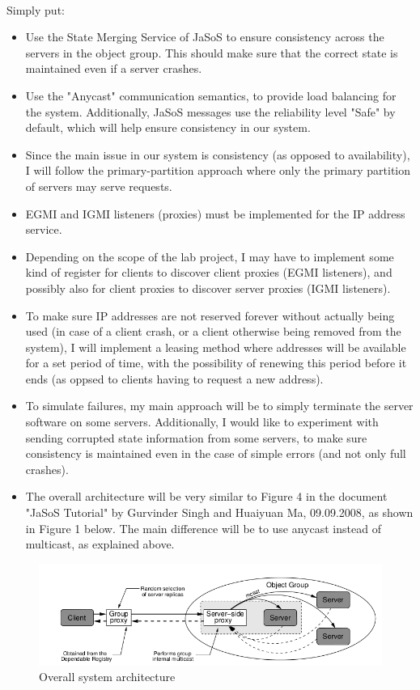 \documentclass[a4paper,11pt]{article}
\begin{document}
\paragraph{}
Simply put:
\begin{itemize}
	\item Use the State Merging Service of JaSoS to ensure consistency across the servers in the object group. This should make sure that  the correct state is maintained even if a server crashes.
	\item Use the "Anycast" communication semantics, to provide load balancing for the system. Additionally, JaSoS messages use the reliability level "Safe" by default, which will help ensure consistency in our system.
	\item Since the main issue in our system is consistency (as opposed to availability), I will follow the primary-partition approach where only the primary partition of servers may serve requests.
	\item EGMI and IGMI listeners (proxies) must be implemented for the IP address service.
	\item Depending on the scope of the lab project, I may have to implement some kind of register for clients to discover client proxies (EGMI listeners), and possibly also for client proxies to discover server proxies (IGMI listeners).
	\item To make sure IP addresses are not reserved forever without actually being used (in case of a client crash, or a client otherwise being removed from the system), I will implement a leasing method where addresses will be available for a set period of time, with the possibility of renewing this period before it ends (as oppsed to clients having to request a new address).
	\item To simulate failures, my main approach will be to simply terminate the server software on some servers. Additionally, I would like to experiment with sending corrupted state information from some servers, to make sure consistency is maintained even in the case of simple errors (and not only full crashes).
	\item The overall architecture will be very similar to Figure 4 in the document "JaSoS Tutorial" by Gurvinder Singh and Huaiyuan Ma, 09.09.2008, as shown in Figure 1 below. The main difference will be to use anycast instead of multicast, as explained above.
\end{itemize}
\begin{figure}
  \begin{center}
    \includegraphics[width=1\textwidth]{arch.png}
  \end{center}
  
  \caption{Overall system architecture}
  \label{path}
\end{figure}
\end{document}
